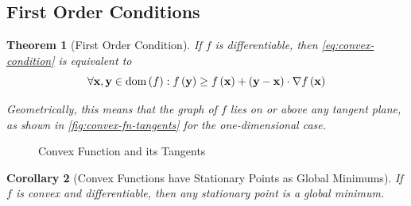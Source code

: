 \documentclass[11pt]{article}
\numberwithin{equation}{section}
\newtheorem{theorem}{Theorem}[section]
\newtheorem{corollary}[theorem]{Corollary}
\theoremstyle{definition}
\theoremstyle{remark}
\newcommand{\pqty}[1]{\left(#1\right)}
\newcommand{\grad}{\nabla}
\newcommand{\vdot}{\cdot}
\DeclareMathOperator{\dom}{dom}
\begin{document}
\subsection{First Order Conditions}

\begin{theorem}[First Order Condition]\label{variation-unit-0012}
    \label{thm:first-order-condition}%
    If \(f\) is differentiable, then \autoref{eq:convex-condition} is equivalent to
    \begin{equation}
        \forall \vb{x}, \vb{y} \in \dom\pqty{f}: f\pqty{\vb{y}} \geq f\pqty{\vb{x}} + \pqty{\vb{y} - \vb{x}} \vdot \grad f\pqty{\vb{x}} \label{eq:first-order-condition}
    \end{equation}

    Geometrically, this means that the graph of \(f\) lies on or above any tangent plane, as shown in \autoref{fig:convex-fn-tangents} for the one-dimensional case.
\end{theorem}

\begin{figure}[ht!]
    \centering

    \caption{Convex Function and its Tangents}
    \label{fig:convex-fn-tangents}
\end{figure}

\begin{corollary}[Convex Functions have Stationary Points as Global Minimums]\label{variation-unit-0013}
    \label{cor:stationary-point-global-minimum}%
    If \(f\) is convex and differentiable, then any stationary point is a global minimum.
\end{corollary}
\end{document}
